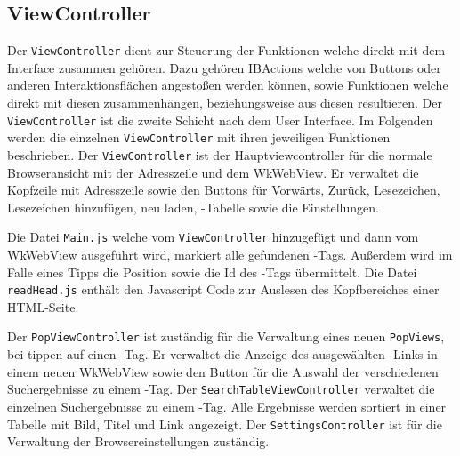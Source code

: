 
\subsection{ViewController}
Der \lstinline|ViewController| dient zur Steuerung der Funktionen welche direkt mit dem Interface zusammen gehören. Dazu gehören
IBActions welche von Buttons oder anderen Interaktionsflächen angestoßen werden können, sowie Funktionen welche direkt mit diesen zusammenhängen, beziehungsweise aus diesen resultieren. Der \lstinline|ViewController| ist die zweite Schicht nach dem User Interface. Im
Folgenden werden die einzelnen \lstinline|ViewController| mit ihren jeweiligen Funktionen beschrieben.
Der \lstinline|ViewController| ist der Hauptviewcontroller für die normale Browseransicht mit der Adresszeile und dem WkWebView. Er verwaltet die Kopfzeile mit Adresszeile sowie den Buttons für Vorwärts, Zurück, Lesezeichen, Lesezeichen hinzufügen, neu laden, \SECH-Tabelle sowie die Einstellungen. 

Die Datei \lstinline|Main.js| welche vom \lstinline|ViewController| hinzugefügt und dann vom WkWebView ausgeführt wird, markiert alle gefundenen \SEARCH-Tags. Außerdem wird im Falle eines Tipps die Position sowie die Id des \SEARCH-Tags übermittelt. Die Datei \lstinline|readHead.js| enthält den Javascript Code zur Auslesen des Kopfbereiches einer HTML-Seite.

Der \lstinline|PopViewController| ist zuständig für die Verwaltung eines neuen \lstinline|PopViews|, bei tippen auf einen \SEARCH-Tag. Er verwaltet die Anzeige des ausgewählten \SEARCH-Links in einem neuen WkWebView sowie den Button für die Auswahl der verschiedenen Suchergebnisse zu einem \SEARCH-Tag.
Der \lstinline|SearchTableViewController| verwaltet die einzelnen Suchergebnisse zu einem \SEARCH-Tag. Alle Ergebnisse werden sortiert in einer Tabelle mit Bild, Titel und Link angezeigt.
Der \lstinline|SettingsController| ist für die Verwaltung der Browsereinstellungen zuständig.